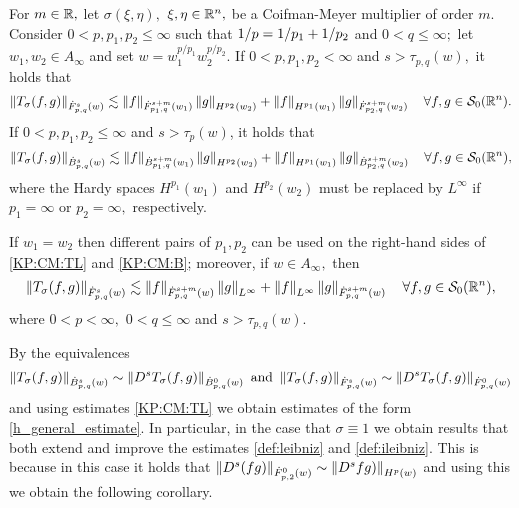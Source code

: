 \begin{theorem}\label{thm:CM:TL:B}  For $m \in \re,$ let $\sigma(\xi,\eta),$ $\xi,\eta\in\rn,$ be a Coifman-Meyer multiplier of order $m.$ Consider  $0 < p, p_1, p_2  \le \infty$  such that $\hcline$ and  $0 < q \leq \infty;$ let  $w_1,w_2\in A_\infty$ and set $w=w_1^{{p}/{p_1}} w_2^{{p}/{p_2}}.$ 
If $0 < p,p_1,p_2 < \infty$ and  $s > \tau_{p,q}(w),$  it holds that
\begin{equation}\label{KP:CM:TL}
\norm{T_\sigma(f,g)}{\tlw{p}{s}{q}{w}} \lesssim \norm{f}{\tlw{p_1}{s+m}{q}{w_1} } \norm{g}{H^{p_2}(w_2)} +  \norm{f}{H^{p_1}(w_1)}   \norm{g}{\tlw{p_2}{s+m}{q}{w_2} } \quad \forall f, g \in \swz.
\end{equation}
If $0< p, p_1,p_2\leq \infty$ and $s > \tau_p(w)$, it holds that
\begin{equation}\label{KP:CM:B}
\norm{T_\sigma(f,g)}{\besw{p}{s}{q}{w}} \lesssim \norm{f}{\besw{p_1}{s+m}{q}{w_1} } \norm{g}{H^{p_2}(w_2)} +  \norm{f}{H^{p_1}(w_1)}   \norm{g}{\besw{p_2}{s+m}{q}{w_2} } \quad \forall f, g \in \swz,
\end{equation}
where the Hardy spaces $H^{p_1}(w_1)$ and $H^{p_2}(w_2)$ must be replaced by $L^\infty$ if $p_1=\infty$ or $p_2=\infty,$ respectively.

If $w_1=w_2$ then different pairs of $p_1, p_2$ can be used on the right-hand sides of \eqref{KP:CM:TL} and \eqref{KP:CM:B}; moreover, if $w\in A_\infty,$ then 
\begin{equation}\label{KP:CM:TL2}
\norm{T_\sigma(f,g)}{\tlw{p}{s}{q}{w}} \lesssim \norm{f}{\tlw{p}{s+m}{q}{w} } \norm{g}{L^\infty} +  \norm{f}{L^\infty}   \norm{g}{\tlw{p}{s+m}{q}{w}} \quad \forall f, g \in \swz,
\end{equation}
where $0<p<\infty,$ $0<q\le\infty$ and $s>\tau_{p,q}(w).$
\end{theorem}

By the equivalences 
\begin{equation}\label{lifting}
\norm{T_\sigma(f,g)}{\besw{p}{s}{q}{w}} \sim \norm{D^s T_\sigma(f,g)}{\besw{p}{0}{q}{w}} \text{ and } \norm{T_\sigma(f,g)}{\tlw{p}{s}{q}{w}} \sim \norm{D^s T_\sigma(f,g)}{\tlw{p}{0}{q}{w}}
\end{equation}
and using estimates \ref{KP:CM:TL} we obtain estimates of the form \ref{h_general_estimate}. In particular, in the case that $\sigma \equiv 1$ we obtain results that both extend and improve the estimates \ref{def:leibniz} and \ref{def:ileibniz}. This is because in this case it holds that $\norm{D^s (fg)}{\tlw{p}{0}{2}{w}} \sim \norm{D^s fg)}{H^p(w)}$ and using this we obtain the following corollary.

